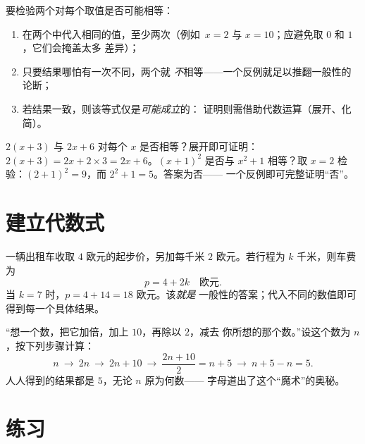 \begin{method}[检验等式]\label{met:g7:literal:test}
要检验两个对每个取值是否可能相等：
\begin{enumerate}
  \item 在两个中代入相同的值，至少两次（例如\
        $x = 2$ 与 $x = 10$；应避免取 $0$ 和 $1$，它们会掩盖太多
        差异）；
  \item 只要结果哪怕有一次不同，两个就
        \emph{不}相等——一个反例就足以推翻一般性的论断；
  \item 若结果一致，则该等式仅是\emph{可能成立}的：
        证明则需借助代数运算（展开、化简）。
\end{enumerate}
\end{method}

\begin{example}\label{ex:g7:literal:test}
$2(x + 3)$ 与 $2x + 6$ 对每个 $x$ 是否相等？展开即可证明：
$2(x+3) = 2x + 2 \times 3 = 2x + 6$。$(x + 1)^2$ 是否与
$x^2 + 1$ 相等？取 $x = 2$ 检验：$(2+1)^2 = 9$，而 $2^2 + 1 = 5$。答案为否——
一个反例即可完整证明“否”。
\end{example}

\section{建立代数式}

\begin{example}[从情境到代数式]\label{ex:g7:literal:produce}
一辆出租车收取 $4$ 欧元的起步价，另加每千米 $2$ 欧元。若行程为
$k$ 千米，则车费为
\[
p = 4 + 2k \quad\text{欧元}.
\]
当 $k = 7$ 时，$p = 4 + 14 = 18$ 欧元。该\emph{就是}
一般性的答案；代入不同的数值即可得到每一个具体结果。
\end{example}

\begin{example}[数字魔术]\label{ex:g7:literal:trick}
“想一个数，把它加倍，加上 $10$，再除以 $2$，减去
你所想的那个数。”设这个数为 $n$，按下列步骤计算：
\[
n \ \to\ 2n \ \to\ 2n + 10 \ \to\ \frac{2n + 10}{2} = n + 5 \ \to\
n + 5 - n = 5 .
\]
人人得到的结果都是 $5$，无论 $n$ 原为何数——
字母道出了这个“魔术”的奥秘。
\end{example}

\section{练习}

